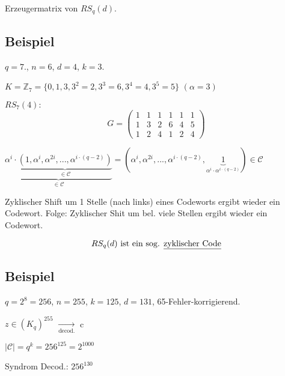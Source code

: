 \documentclass[a4paper, openany]{book}
\begin{document}
Erzeugermatrix von $RS_q(d)$.

\subsection{Beispiel}

$q = 7$., $n = 6$, $d = 4$, $k = 3$.

$K = \mathbb{Z}_7 = \{0, 1, 3, 3^2 = 2, 3^3 = 6, 3^4 = 4, 3^5 = 5\}$ $(\alpha = 3)$

\par \medskip

$RS_7(4):$ \[ G = \begin{pmatrix}1 & 1 & 1 & 1 & 1 & 1 \\ 1 & 3 & 2 & 6 & 4 & 5 \\ 1 & 2 & 4 & 1 & 2 & 4 \end{pmatrix} \]

$\underbrace{\alpha^i \cdot \underbrace{(1, \alpha^i, \alpha^{2i}, ..., \alpha^{i \cdot (q-2)})}_{\in \mathcal{C}}}_{\in \mathcal{C}} = (\alpha^i, \alpha^{2i}, ..., \alpha^{i \cdot (q-2)}, \underbrace{1}_{\alpha^i \cdot \alpha^{i \cdot (q-2)}}) \in \mathcal{C}$

\par \medskip

Zyklischer Shift um 1 Stelle (nach links) eines Codeworts ergibt wieder ein Codewort. Folge: Zyklischer Shit um bel. viele Stellen ergibt wieder ein Codewort.

\par \medskip

\[ RS_q(d) \text{ ist ein sog. \underline{zyklischer Code}} \]

\subsection{Beispiel}

$q = 2^8 = 256$, $n = 255$, $k = 125$, $d = 131$, 65-Fehler-korrigierend.

\par \medskip

$z \in (K_q)^{255}$ $\underset{\text{decod.}}{\rightarrow}$ c

\par \medskip

$|\mathcal{C}| = q^k = 256^{125} = 2^{1000}$

\par \medskip

Syndrom Decod.: $256^{130}$

\par \medskip
\end{document}
